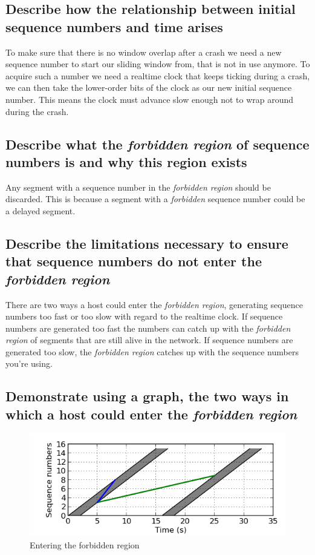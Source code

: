 \documentclass[9pt, a4paper, oneside]{article}
\begin{document}
\subsection{Describe how the relationship between initial sequence numbers and
            time arises}

To make sure that there is no window overlap after a crash we need a new
sequence number to start our sliding window from, that is not in use anymore.
To acquire such a number we need a realtime clock that keeps ticking during
a crash, we can then take the lower-order bits of the clock as our new initial
sequence number.
This means the clock must advance slow enough not to wrap around during the
crash.

\subsection{Describe what the \emph{forbidden region} of sequence numbers is
            and why this region exists}

Any segment with a sequence number in the \emph{forbidden region} should be
discarded.
This is because a segment with a \emph{forbidden} sequence number could be
a delayed segment.

\subsection{Describe the limitations necessary to ensure that sequence numbers
            do not enter the \emph{forbidden region}}

There are two ways a host could enter the \emph{forbidden region}, generating
sequence numbers too fast or too slow with regard to the realtime clock.
If sequence numbers are generated too fast the numbers can catch up with the
\emph{forbidden region} of segments that are still alive in the network.
If sequence numbers are generated too slow, the \emph{forbidden region}
catches up with the sequence numbers you're using.

\subsection{Demonstrate using a graph, the two ways in which a host could
            enter the \emph{forbidden region}}

\begin{figure}[h]
\centering
\includegraphics{forbiddenregion.png}
\caption{Entering the forbidden region}
\end{figure}
\end{document}
